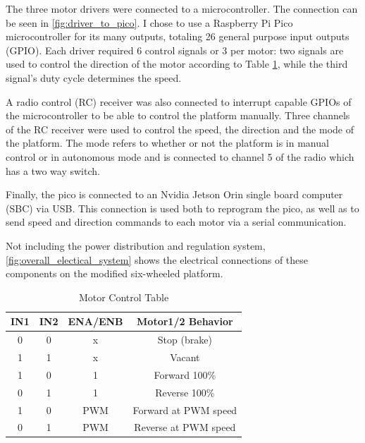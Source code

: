 \documentclass[11pt]{article}
\begin{document}
                The three motor drivers were connected to a microcontroller. The connection can be seen in \ref{fig:driver_to_pico}.
                I chose to use a Raspberry Pi Pico microcontroller for its many outputs, totaling 26 general purpose input outputs (GPIO). Each driver required 6 control signals or 3 per motor: two signals are used to control the direction of the motor according to Table \ref{tab:motor_control}, while the third signal's duty cycle determines the speed.

                A radio control (RC) receiver was also connected to interrupt capable GPIOs of the microcontroller to be able to control the platform manually. Three channels of the RC receiver were used to control the speed, the direction and the mode of the platform. The mode refers to whether or not the platform is in manual control or in autonomous mode and is connected to channel 5 of the radio which has a two way switch.

                Finally, the pico is connected to an Nvidia Jetson Orin single board computer (SBC) via USB. This connection is used both to reprogram the pico, as well as to send speed and direction commands to each motor via a serial communication. 

                Not including the power distribution and regulation system, \ref{fig:overall_electical_system} shows the electrical connections of these components on the modified six-wheeled platform.


                \begin{table}[h!]
                    \centering
                    \begin{tabular}{|c|c|c|c|}
                    \hline
                    IN1 & IN2 & ENA/ENB & Motor1/2 Behavior \\ \hline
                    0   & 0   & x       & Stop (brake)      \\ \hline
                    1   & 1   & x       & Vacant            \\ \hline
                    1   & 0   & 1       & Forward 100\%     \\ \hline
                    0   & 1   & 1       & Reverse 100\%     \\ \hline
                    1   & 0   & PWM     & Forward at PWM speed \\ \hline
                    0   & 1   & PWM     & Reverse at PWM speed \\ \hline
                    \end{tabular}
                    \caption{Motor Control Table}
                    \label{tab:motor_control}
                \end{table}
\end{document}
